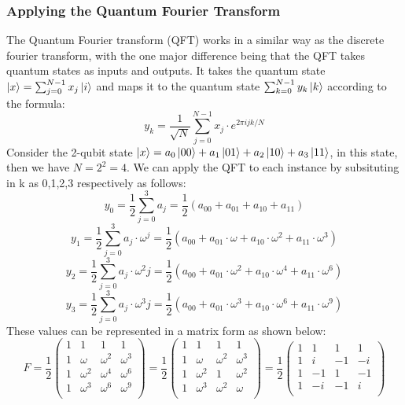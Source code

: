 \subsubsection{Applying the Quantum Fourier Transform}
The Quantum Fourier transform (QFT) works in a similar way as the discrete fourier transform, with the one major difference being that the QFT takes quantum states as inputs and outputs. It takes the quantum state $\ket{x} = \sum_{j=0}^{N-1}x_j\ket{i}$ and maps it to the quantum state  $\sum_{k=0}^{N-1}y_k\ket{k}$ according to the formula:
$$y_k = \frac{1}{\sqrt{N}}\sum_{j=0}^{N-1}x_j\cdot{e^{2\pi ijk/N}}$$
Consider the 2-qubit state $\ket{x} = a_0\ket{00} + a_1\ket{01} + a_2\ket{10} + a_3\ket{11}$, in this state, then we have $N = 2^2 = 4$. We can apply the QFT to each instance by subsituting in k as 0,1,2,3 respectively as follows:
$$y_0 = \frac{1}{2}\sum_{j=0}^{3}a_j=\frac{1}{2}(a_{00}+a_{01}+a_{10}+a_{11})$$
$$y_1 = \frac{1}{2}\sum_{j=0}^{3}a_j\cdot{\omega^j}=\frac{1}{2}(a_{00}+a_{01}\cdot{\omega}+a_{10}\cdot{\omega^2}+a_{11}\cdot{\omega^3})$$
$$y_2 = \frac{1}{2}\sum_{j=0}^{3}a_j\cdot{\omega^2j}=\frac{1}{2}(a_{00}+a_{01}\cdot{\omega^2}+a_{10}\cdot{\omega^4}+a_{11}\cdot{\omega^6})$$
$$y_3 = \frac{1}{2}\sum_{j=0}^{3}a_j\cdot{\omega^3j}=\frac{1}{2}(a_{00}+a_{01}\cdot{\omega^3}+a_{10}\cdot{\omega^6}+a_{11}\cdot{\omega^9})$$
These values can be represented in a matrix form as shown below:
$$F = \frac{1}{2}
\begin{pmatrix} 
1 & 1 & 1 & 1 \\
1 & \omega & \omega^2 & \omega^3 \\
1 & \omega^2 & \omega^4 & \omega^6 \\
1 & \omega^3 & \omega^6 & \omega^9 \\
\end{pmatrix} = \frac{1}{2} 
\begin{pmatrix}
1 & 1 & 1 & 1 \\
1 & \omega & \omega^2 & \omega^3 \\
1 & \omega^2 & 1 & \omega^2 \\
1 & \omega^3 & \omega^2 & \omega \\
\end{pmatrix} = \frac{1}{2} 
\begin{pmatrix}
1 & 1 & 1 & 1 \\
1 & i & -1 & -i \\
1 & -1 & 1 & -1 \\
1 & -i & -1 & i \\
\end{pmatrix}
$$
